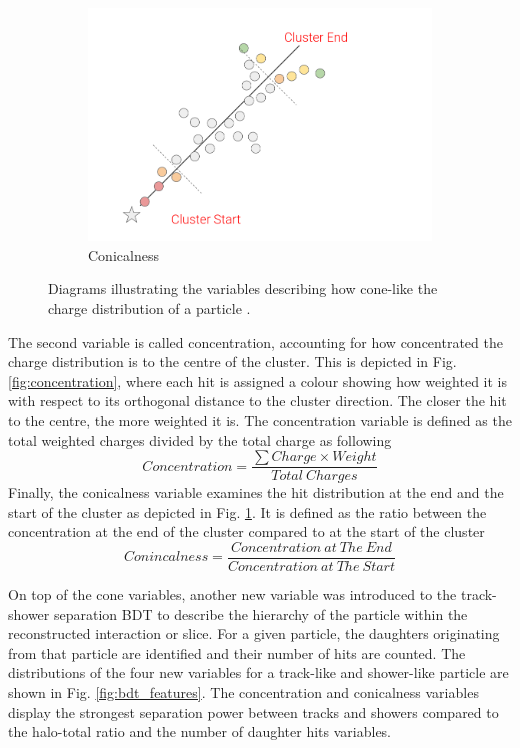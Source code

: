 \begin{figure}[b!]
\begin{subfigure}[b]{0.495\textwidth}
            \includegraphics[width=\textwidth]{Conicalness}
            \caption{Conicalness}%
            \label{fig:conicalness}
        \end{subfigure}
        \caption[Cone-Like Variable Diagrams]{
	Diagrams illustrating the variables describing how cone-like the charge distribution of a particle .
	}
        \label{fig:cone_variables}
\end{figure}

The second variable is called concentration, accounting for how concentrated the charge distribution is to the centre of the cluster.
This is depicted in Fig. \ref{fig:concentration}, where each hit is assigned a colour showing how weighted it is with respect to its orthogonal distance to the cluster direction.
The closer the hit to the centre, the more weighted it is.
The concentration variable is defined as the total weighted charges divided by the total charge as following
\begin{equation}
	Concentration = \frac{\sum Charge \times Weight}{Total\ Charges}
\end{equation}
Finally, the conicalness variable examines the hit distribution at the end and the start of the cluster as depicted in Fig. \ref{fig:conicalness}. 
It is defined as the ratio between the concentration at the end of the cluster compared to at the start of the cluster
\begin{equation}
	Conincalness = \frac{Concentration\ at\ The\ End}{Concentration\ at\ The\ Start}
\end{equation}

On top of the cone variables, another new variable was introduced to the track-shower separation BDT to describe the hierarchy of the particle within the reconstructed interaction or slice.
For a given particle, the daughters originating from that particle are identified and their number of hits are counted.
The distributions of the four new variables for a track-like and shower-like particle are shown in Fig. \ref{fig:bdt_features}.
The concentration and conicalness variables display the strongest separation power between tracks and showers compared to the halo-total ratio and the number of daughter hits variables.

